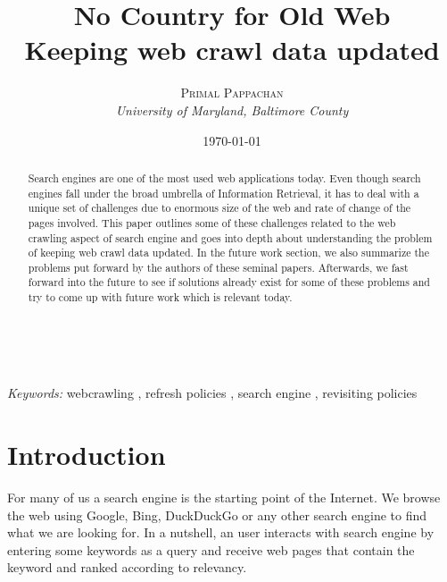 \documentclass[a4paper, 11pt]{article} %
\title{\textbf{No Country for Old Web}\\ %
Keeping web crawl data updated} %
\author{\textsc{Primal Pappachan} %
\\{\textit{University of Maryland, Baltimore County}}} %
\date{\today} %
\makeatletter
\renewcommand{\maketitle}{ %
\begin{flushright} %
{\LARGE\@title} %

\vspace{50pt} %

{\large\@author} %
\\\@date %

\vspace{40pt} %
\end{flushright}
}
\makeatother
\begin{document}
\maketitle %
\tableofcontents



\begin{abstract}

Search engines are one of the most used web applications today. Even though search engines fall under the broad umbrella of Information Retrieval, it has to deal with a unique set of challenges due to enormous size of the web and rate of change of the pages involved. This paper outlines some of these challenges related to the web crawling aspect of search engine and goes into depth about understanding the problem of keeping web crawl data updated. In the future work section, we also summarize the problems put forward by the authors of these seminal papers. Afterwards, we fast forward into the future to see if solutions already exist for some of these problems and try to come up with future work which is relevant today.   

\end{abstract}

\hspace*{3,6mm}\textit{Keywords:} webcrawling , refresh policies , search engine , revisiting policies %

\vspace{30pt} %


\section{Introduction}

For many of us a search engine is the starting point of the Internet. We browse the web using Google, Bing, DuckDuckGo or any other search engine to find what we are looking for. In a nutshell, an user interacts with search engine by entering some keywords as a query and receive web pages that contain the keyword and ranked according to relevancy. \\
\end{document}
